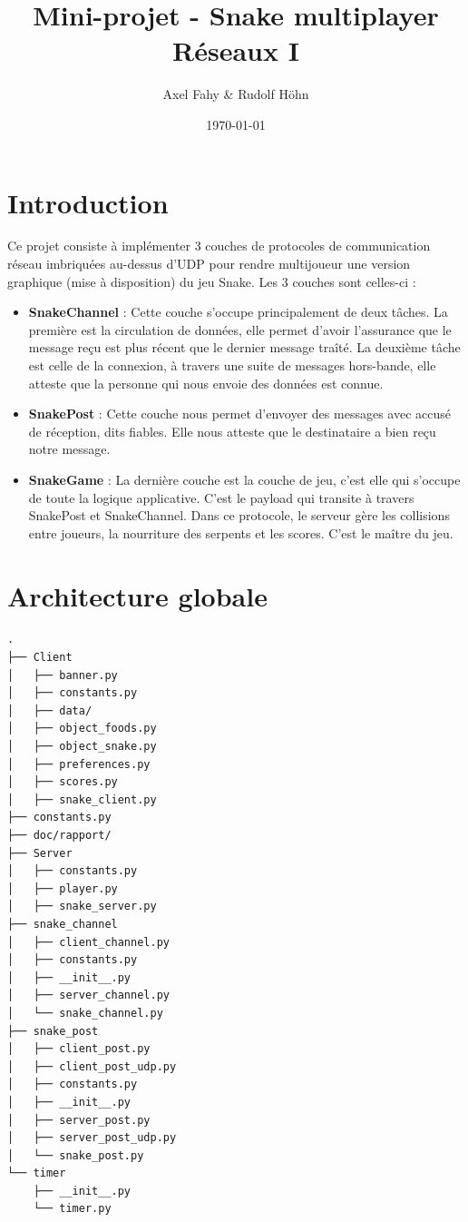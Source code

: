 \documentclass[a4paper]{article}
\title{Mini-projet - Snake multiplayer\\Réseaux I}
\author{Axel Fahy \& Rudolf Höhn}
\date{\today}
\begin{document}
\maketitle

\section{Introduction}
Ce projet consiste à implémenter 3 couches de protocoles de communication réseau imbriquées au-dessus d'UDP pour rendre multijoueur une version graphique (mise à disposition) du jeu Snake. Les 3 couches sont celles-ci :
\begin{itemize}
\item \textbf{SnakeChannel} : Cette couche s'occupe principalement de deux tâches. La première est la circulation de données, elle permet d'avoir l'assurance que le message reçu est plus récent que le dernier message traîté. La deuxième tâche est celle de la connexion, à travers une suite de messages hors-bande, elle atteste que la personne qui nous envoie des données est connue.
\item \textbf{SnakePost} : Cette couche nous permet d'envoyer des messages avec accusé de réception, dits fiables. Elle nous atteste que le destinataire a bien reçu notre message.
\item \textbf{SnakeGame} : La dernière couche est la couche de jeu, c'est elle qui s'occupe de toute la logique applicative. C'est le payload qui transite à travers SnakePost et SnakeChannel. Dans ce protocole, le serveur gère les collisions entre joueurs, la nourriture des serpents et les scores. C'est le maître du jeu.
\end{itemize}

\section{Architecture globale}
\begin{verbatim}
.
├── Client
│   ├── banner.py
│   ├── constants.py
│   ├── data/
│   ├── object_foods.py
│   ├── object_snake.py
│   ├── preferences.py
│   ├── scores.py
│   ├── snake_client.py
├── constants.py
├── doc/rapport/
├── Server
│   ├── constants.py
│   ├── player.py
│   ├── snake_server.py
├── snake_channel
│   ├── client_channel.py
│   ├── constants.py
│   ├── __init__.py
│   ├── server_channel.py
│   └── snake_channel.py
├── snake_post
│   ├── client_post.py
│   ├── client_post_udp.py
│   ├── constants.py
│   ├── __init__.py
│   ├── server_post.py
│   ├── server_post_udp.py
│   └── snake_post.py
└── timer
    ├── __init__.py
    └── timer.py
\end{verbatim}
\end{document}
